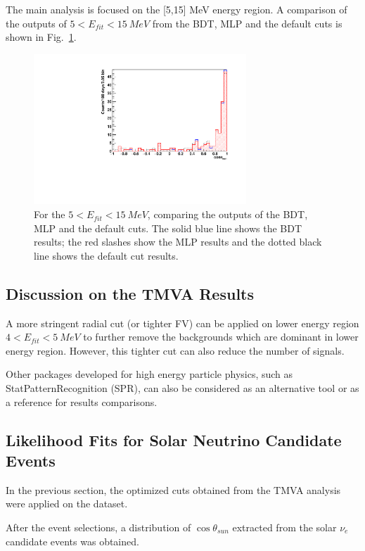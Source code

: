 

The main analysis is focused on the [5,15] MeV energy region. A comparison of the outputs of $5<E_{fit}<15~MeV$ from the BDT, MLP and the default cuts is shown in Fig.~\ref{compare_cosThetaToSun_5to15}.
\begin{figure}[!htb]
	\centering
	\includegraphics[width=8cm]{Compare_cosThetaSun_5to15.pdf}
	\caption{For the $5<E_{fit}<15~MeV$, comparing the outputs of the BDT, MLP and the default cuts. The solid blue line shows the BDT results; the red slashes show the MLP results and the dotted black line shows the default cut results.}
	\label{compare_cosThetaToSun_5to15}
\end{figure}

\subsection{Discussion on the TMVA Results}
A more stringent radial cut (or tighter FV) can be applied on lower energy region $4<E_{fit}<5~MeV$ to further remove the backgrounds which are dominant in lower energy region. However, this tighter cut can also reduce the number of signals.

Other packages developed for high energy particle physics, such as StatPatternRecognition (SPR)\cite{sprWebsite}, can also be considered as an alternative tool or as a reference for results comparisons. 

\subsection{Likelihood Fits for Solar Neutrino Candidate Events}
In the previous section, the optimized cuts obtained from the TMVA analysis were applied on the dataset. 

After the event selections, a distribution of $\cos\theta_{sun}$ extracted from the solar $\nu_e$ candidate events was obtained. 

